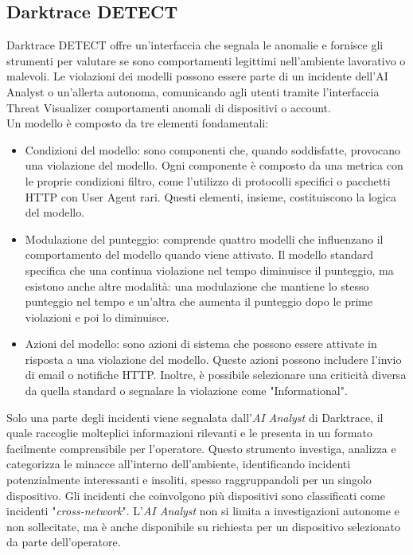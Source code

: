 \subsection{Darktrace DETECT}
Darktrace DETECT offre un'interfaccia che segnala le anomalie e fornisce gli strumenti per valutare se sono comportamenti legittimi nell'ambiente lavorativo o malevoli. Le violazioni dei modelli possono essere parte di un incidente dell'AI Analyst o un'allerta autonoma, comunicando agli utenti tramite l'interfaccia Threat Visualizer comportamenti anomali di dispositivi o account\cite{threat2}.\\
Un modello è composto da tre elementi fondamentali:
\begin{itemize}
	\item Condizioni del modello: sono componenti che, quando soddisfatte, provocano una violazione del modello. Ogni componente è composto da una metrica con le proprie condizioni filtro, come l'utilizzo di protocolli specifici o pacchetti HTTP con User Agent rari. Questi elementi, insieme, costituiscono la logica del modello.
	\item Modulazione del punteggio: comprende quattro modelli che influenzano il comportamento del modello quando viene attivato. Il modello standard specifica che una continua violazione nel tempo diminuisce il punteggio, ma esistono anche altre modalità: una modulazione che mantiene lo stesso punteggio nel tempo e un'altra che aumenta il punteggio dopo le prime violazioni e poi lo diminuisce.
	\item Azioni del modello: sono azioni di sistema che possono essere attivate in risposta a una violazione del modello. Queste azioni possono includere l'invio di email o notifiche HTTP. Inoltre, è possibile selezionare una criticità diversa da quella standard o segnalare la violazione come "Informational"\cite{model}.
\end{itemize}
Solo una parte degli incidenti viene segnalata dall'\textit{AI Analyst} di Darktrace, il quale raccoglie molteplici informazioni rilevanti e le presenta in un formato facilmente comprensibile per l'operatore. Questo strumento investiga, analizza e categorizza le minacce all'interno dell'ambiente, identificando incidenti potenzialmente interessanti e insoliti, spesso raggruppandoli per un singolo dispositivo. Gli incidenti che coinvolgono più dispositivi sono classificati come incidenti "\textit{cross-network}". L'\textit{AI Analyst} non si limita a investigazioni autonome e non sollecitate, ma è anche disponibile su richiesta per un dispositivo selezionato da parte dell'operatore.\\
